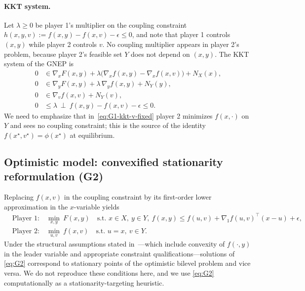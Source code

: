 \documentclass[11pt]{article}
\theoremstyle{definition}
\newcommand{\eps}{\epsilon}
\begin{document}
\paragraph{KKT system.}
Let $\lambda\ge 0$ be player 1's multiplier on the coupling
constraint
$h(x,y,v):=f(x,y)-f(x,v)-\eps\le 0$, and note that player 1
controls $(x,y)$ while player 2 controls $v$. No coupling
multiplier appears in player 2's problem, because player 2's
feasible set $Y$ does not depend on $(x,y)$. The KKT system of
the GNEP is
\begin{align}
  0&\in\nabla_x F(x,y)+\lambda\bigl(\nabla_x f(x,y)-\nabla_x f(x,v)\bigr)+N_X(x),
  \label{eq:G1-kkt-x}\\
  0&\in\nabla_y F(x,y)+\lambda\,\nabla_y f(x,y)+N_Y(y),
  \label{eq:G1-kkt-y}\\
  0&\in \nabla_v f(x,v)+N_Y(v),
  \label{eq:G1-kkt-v-fixed}\\
  0&\le\lambda\ \perp\ f(x,y)-f(x,v)-\eps\le 0.
  \label{eq:G1-kkt-comp}
\end{align}
We need to emphasize that in~\eqref{eq:G1-kkt-v-fixed} player 2 minimizes
$f(x,\cdot)$ on $Y$ and sees no coupling constraint; this is the
source of the identity $f(x^\star,v^\star)=\phi(x^\star)$ at
equilibrium.

\subsection{Optimistic model: convexified stationarity reformulation (G2)}
\label{sec:G2}
Replacing $f(x,v)$ in the coupling constraint by its first-order
lower approximation in the $x$-variable yields
\begin{equation}\tag{G2}\label{eq:G2}
\begin{aligned}
  &\text{Player 1:}\quad \min_{x,y}\ F(x,y)
  \quad \text{s.t. } x\in X,\ y\in Y,\
  f(x,y)\le f(u,v)+\nabla_1 f(u,v)^\top(x-u)+\eps,\\
  &\text{Player 2:}\quad \min_{u,v}\ f(x,v)
  \quad \text{s.t. } u=x,\ v\in Y.
\end{aligned}
\end{equation}
Under the structural assumptions stated
in~\cite{lampariello2020numerically}---which include convexity of
$f(\cdot,y)$ in the leader variable and appropriate constraint
qualifications---solutions of \eqref{eq:G2} correspond to
stationary points of the optimistic bilevel problem and vice
versa. We do not reproduce these conditions here, and we use
\eqref{eq:G2} computationally as a stationarity-targeting
heuristic.
\end{document}
